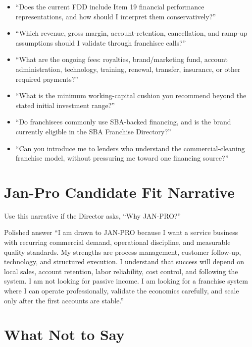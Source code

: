 \documentclass[11pt]{article}
\newcommand{\janpro}{JAN-PRO}
\begin{document}
\begin{itemize}
  \item ``Does the current FDD include Item 19 financial performance representations, and how should I interpret them conservatively?''
  \item ``Which revenue, gross margin, account-retention, cancellation, and ramp-up assumptions should I validate through franchisee calls?''
  \item ``What are the ongoing fees: royalties, brand/marketing fund, account administration, technology, training, renewal, transfer, insurance, or other required payments?''
  \item ``What is the minimum working-capital cushion you recommend beyond the stated initial investment range?''
  \item ``Do franchisees commonly use SBA-backed financing, and is the brand currently eligible in the SBA Franchise Directory?''
  \item ``Can you introduce me to lenders who understand the commercial-cleaning franchise model, without pressuring me toward one financing source?''
\end{itemize}

\section{Jan-Pro Candidate Fit Narrative}

Use this narrative if the Director asks, ``Why \janpro{}?''

\begin{keybox}{Polished answer}
``I am drawn to \janpro{} because I want a service business with recurring commercial demand, operational discipline, and measurable quality standards. My strengths are process management, customer follow-up, technology, and structured execution. I understand that success will depend on local sales, account retention, labor reliability, cost control, and following the system. I am not looking for passive income. I am looking for a franchise system where I can operate professionally, validate the economics carefully, and scale only after the first accounts are stable.''
\end{keybox}

\section{What Not to Say}
\end{document}
